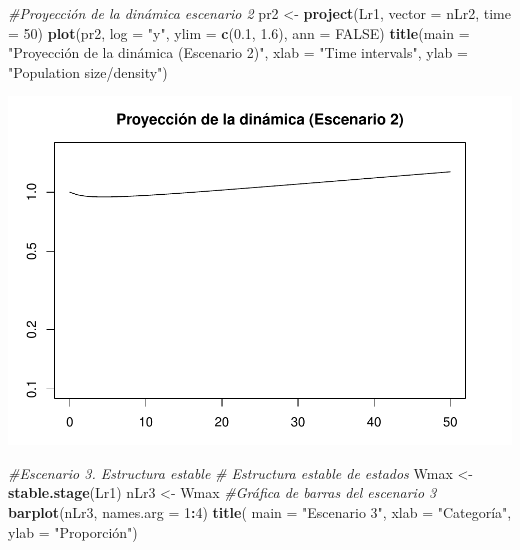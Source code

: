 \documentclass[
]{book}
\newenvironment{Shaded}{\begin{snugshade}}{\end{snugshade}}
\newcommand{\AttributeTok}[1]{\textcolor[rgb]{0.13,0.29,0.53}{#1}}
\newcommand{\CommentTok}[1]{\textcolor[rgb]{0.56,0.35,0.01}{\textit{#1}}}
\newcommand{\ConstantTok}[1]{\textcolor[rgb]{0.56,0.35,0.01}{#1}}
\newcommand{\DecValTok}[1]{\textcolor[rgb]{0.00,0.00,0.81}{#1}}
\newcommand{\FloatTok}[1]{\textcolor[rgb]{0.00,0.00,0.81}{#1}}
\newcommand{\FunctionTok}[1]{\textcolor[rgb]{0.13,0.29,0.53}{\textbf{#1}}}
\newcommand{\NormalTok}[1]{#1}
\newcommand{\OtherTok}[1]{\textcolor[rgb]{0.56,0.35,0.01}{#1}}
\newcommand{\SpecialCharTok}[1]{\textcolor[rgb]{0.81,0.36,0.00}{\textbf{#1}}}
\newcommand{\StringTok}[1]{\textcolor[rgb]{0.31,0.60,0.02}{#1}}
\theoremstyle{definition}
\theoremstyle{definition}
\theoremstyle{definition}
\theoremstyle{definition}
\theoremstyle{remark}
\begin{document}
\begin{Shaded}
\begin{Highlighting}[]
\CommentTok{\#Proyección de la dinámica escenario 2 }
\NormalTok{pr2 }\OtherTok{\textless{}{-}} \FunctionTok{project}\NormalTok{(Lr1, }\AttributeTok{vector =}\NormalTok{ nLr2, }\AttributeTok{time =} \DecValTok{50}\NormalTok{)}
\FunctionTok{plot}\NormalTok{(pr2, }\AttributeTok{log =} \StringTok{"y"}\NormalTok{, }\AttributeTok{ylim =} \FunctionTok{c}\NormalTok{(}\FloatTok{0.1}\NormalTok{, }\FloatTok{1.6}\NormalTok{), }\AttributeTok{ann =} \ConstantTok{FALSE}\NormalTok{)}
\FunctionTok{title}\NormalTok{(}\AttributeTok{main =} \StringTok{"Proyección de la dinámica (Escenario 2)"}\NormalTok{, }\AttributeTok{xlab =} \StringTok{"Time intervals"}\NormalTok{, }\AttributeTok{ylab =} \StringTok{"Population size/density"}\NormalTok{)}
\end{Highlighting}
\end{Shaded}

\includegraphics{Diagnostico_Poblacional_files/figure-latex/chap10_4-4.pdf}

\begin{Shaded}
\begin{Highlighting}[]
\CommentTok{\#Escenario 3. Estructura estable}
\CommentTok{\# Estructura estable de estados}
\NormalTok{Wmax }\OtherTok{\textless{}{-}} \FunctionTok{stable.stage}\NormalTok{(Lr1)}
\NormalTok{nLr3 }\OtherTok{\textless{}{-}}\NormalTok{ Wmax}
\CommentTok{\#Gráfica de barras del escenario 3}
\FunctionTok{barplot}\NormalTok{(nLr3, }\AttributeTok{names.arg =} \DecValTok{1}\SpecialCharTok{:}\DecValTok{4}\NormalTok{)}
\FunctionTok{title}\NormalTok{( }\AttributeTok{main =} \StringTok{"Escenario 3"}\NormalTok{, }\AttributeTok{xlab =} \StringTok{"Categoría"}\NormalTok{, }\AttributeTok{ylab =} \StringTok{"Proporción"}\NormalTok{)}
\end{Highlighting}
\end{Shaded}
\end{document}
